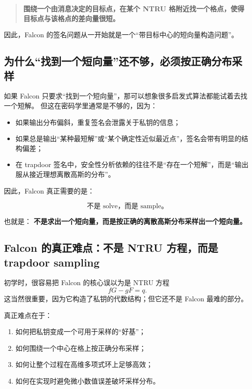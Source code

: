 \documentclass[11pt,a4paper]{ctexart}
\begin{document}
\begin{quote}
\textbf{围绕一个由消息决定的目标点，在某个 NTRU 格附近找一个格点，使得目标点与该格点的差向量很短。}
\end{quote}

因此，Falcon 的签名问题从一开始就是一个“带目标中心的短向量构造问题”。

\subsection{为什么“找到一个短向量”还不够，必须按正确分布采样}

如果 Falcon 只要求“找到一个短向量”，那可以想象很多启发式算法都能试着去找一个短解。  
但这在密码学里通常是不够的，因为：

\begin{itemize}
    \item 如果输出分布偏斜，重复签名会泄露关于私钥的信息；
    \item 如果总是输出“某种最短解”或“某个确定性近似最近点”，签名会带有明显的结构偏差；
    \item 在 trapdoor 签名中，安全性分析依赖的往往不是“存在一个短解”，而是“输出服从接近理想离散高斯的分布”。
\end{itemize}

因此，Falcon 真正需要的是：

\[
\text{不是 solve，而是 sample。}
\]

也就是：  
\textbf{不是求出一个短向量，而是按正确的离散高斯分布采样出一个短向量。}

\subsection{Falcon 的真正难点：不是 NTRU 方程，而是 trapdoor sampling}

初学时，很容易把 Falcon 的核心误以为是 NTRU 方程
\[
fG-gF=q.
\]
这当然很重要，因为它构造了私钥的代数结构；但它还不是 Falcon 最难的部分。

真正难点在于：

\begin{enumerate}
    \item 如何把私钥变成一个可用于采样的“好基”；
    \item 如何围绕一个中心在格上按正确分布采样；
    \item 如何让整个过程在高维多项式环上足够高效；
    \item 如何在实现时避免微小数值误差破坏采样分布。
\end{enumerate}
\end{document}
